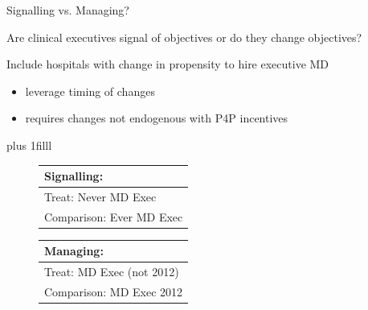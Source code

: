 \documentclass[notes,11pt, aspectratio=169]{beamer}
\newcommand{\btVFill}{\vskip0pt plus 1filll}
\begin{document}
\begin{frame}{Signalling vs. Managing?}\label{sigman}
    \vspace{7mm}

   Are clinical executives signal of objectives or do they change objectives?
   
   \vspace{7mm}
   
\begin{block}{}
    Include hospitals with change in propensity to hire executive MD
    \begin{itemize}
        \item leverage timing of changes
        \item requires changes not endogenous with P4P incentives \hyperlink{execchanges}{}
    \end{itemize}
\end{block}
\btVFill\pause

\begin{figure}[ht!]
    \begin{center}
 \begin{tabular}{| m{18em} |}
 \hline
 Signalling:\\ [0.5ex]
 \hline\hline 
 \vspace{2mm}
 Treat: \hspace{20mm} Never MD Exec \\
 \vspace{2mm} 
 Comparison: \hspace{8mm} Ever MD Exec  \\
 [1ex]
 \hline
 \end{tabular}
\hfil   %
 \begin{tabular}{|m{18em}|}
 \hline
 Managing:\\ [0.5ex]
 \hline\hline
 \vspace{2mm}
 Treat: \hspace{20mm} MD Exec (not 2012) \\
 \vspace{2mm}
 Comparison: \hspace{8mm} MD Exec 2012  \\
 [1ex]
 \hline
 \end{tabular}

 \end{center}
 \end{figure}
\end{frame}
\end{document}
